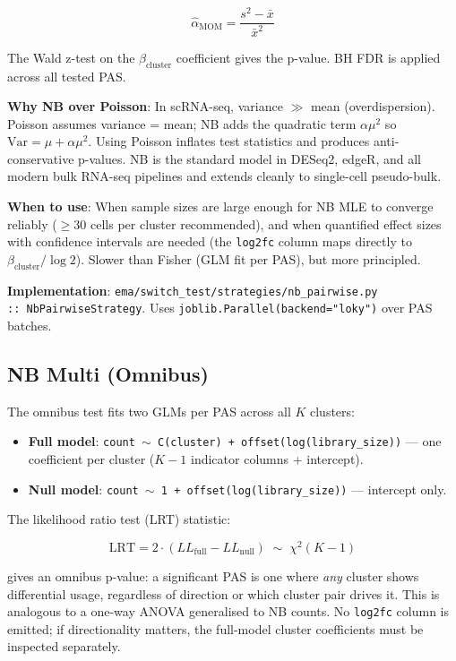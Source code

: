 \documentclass[11pt,a4paper]{article}
\begin{document}
\[
  \hat{\alpha}_{\mathrm{MOM}} = \frac{s^2 - \bar{x}}{\bar{x}^2}
\]

The Wald z-test on the $\beta_{\text{cluster}}$ coefficient gives the p-value. BH FDR
is applied across all tested PAS.

\textbf{Why NB over Poisson}: In scRNA-seq, variance $\gg$ mean (overdispersion).
Poisson assumes variance = mean; NB adds the quadratic term $\alpha \mu^2$ so
$\mathrm{Var} = \mu + \alpha \mu^2$. Using Poisson inflates test statistics and
produces anti-conservative p-values. NB is the standard model in DESeq2, edgeR, and
all modern bulk RNA-seq pipelines and extends cleanly to single-cell pseudo-bulk.

\textbf{When to use}: When sample sizes are large enough for NB MLE to converge
reliably ($\geq 30$ cells per cluster recommended), and when quantified effect sizes
with confidence intervals are needed (the \texttt{log2fc} column maps directly to
$\beta_{\text{cluster}} / \log 2$). Slower than Fisher (GLM fit per PAS), but more
principled.

\textbf{Implementation}: \texttt{ema/switch\_test/strategies/nb\_pairwise.py}\\
\hspace*{1em}\texttt{:: NbPairwiseStrategy}. Uses \texttt{joblib.Parallel(backend="loky")} over PAS batches.

\subsection{NB Multi (Omnibus)}

The omnibus test fits two GLMs per PAS across all $K$ clusters:

\begin{itemize}
  \item \textbf{Full model}: \texttt{count $\sim$ C(cluster) + offset(log(library\_size))}
        --- one coefficient per cluster ($K{-}1$ indicator columns + intercept).
  \item \textbf{Null model}: \texttt{count $\sim$ 1 + offset(log(library\_size))}
        --- intercept only.
\end{itemize}

The likelihood ratio test (LRT) statistic:

\[
  \mathrm{LRT} = 2 \cdot (LL_{\text{full}} - LL_{\text{null}}) \;\sim\; \chi^2(K{-}1)
\]

gives an omnibus p-value: a significant PAS is one where \emph{any} cluster shows
differential usage, regardless of direction or which cluster pair drives it. This is
analogous to a one-way ANOVA generalised to NB counts. No \texttt{log2fc} column is
emitted; if directionality matters, the full-model cluster coefficients must be
inspected separately.
\end{document}
